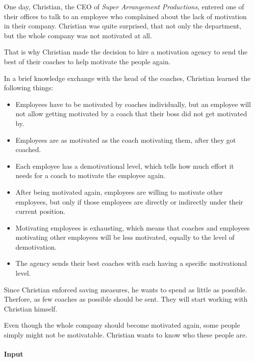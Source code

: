 



\makeheader

One day, Christian, the CEO of \textit{Super Arrangement Productions}, entered one of their offices
to talk to an employee who complained about the lack of motivation in their company. 
Christian was quite surprised, that not only the department, but the whole company was not motivated
at all.

That is why Christian made the decision to hire a motivation agency to send the best of their coaches
to help motivate the people again.

In a brief knowledge exchange with the head of the coaches, Christian learned the following things:

\begin{itemize}
  \item Employees have to be motivated by coaches individually, but an employee will not allow getting motivated
        by a coach that their boss did not get motivated by.
  \item Employees are as motivated as the coach motivating them, after they got coached.
  \item Each employee has a demotivational level, which tells how much effort it needs for a coach to
        motivate the employee again.
  \item After being motivated again, employees are willing to motivate other employees, but only if those
        employees are directly or indirectly under their current position.
  \item Motivating employees is exhausting, which means that coaches and employees motivating other employees
        will be less motivated, equally to the level of demotivation.
  \item The agency sends their best coaches with each having a specific motivational level.
\end{itemize}

Since Christian enforced saving measures, he wants to spend as little as possible. Therfore, as few coaches 
as possible should be sent. They will start working with Christian himself.

Even though the whole company should become motivated again, some people simply might not be motivatable.
Christian wants to know who these people are.

\paragraph*{Input}

